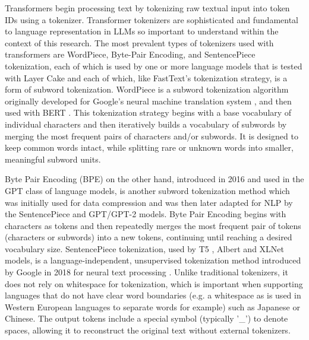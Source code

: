 \documentclass[final]{clv2025}
\begin{document}
Transformers begin processing text by tokenizing raw textual input into token IDs using a tokenizer. Transformer tokenizers are sophisticated and fundamental to language representation in LLMs so important to understand within the context of this research. The most prevalent types of tokenizers used with transformers are WordPiece, Byte-Pair Encoding, and SentencePiece tokenization, each of which is used by one or more language models that is tested with Layer Cake and each of which, like FastText's tokenization strategy, is a form of subword tokenization. WordPiece is a subword tokenization algorithm originally developed for Google's neural machine translation system \cite{schuster} \cite{wu}, and then used with BERT \cite{devlin-etal-2019-bert}. This tokenization strategy begins with a base vocabulary of individual characters and then iteratively builds a vocabulary of subwords by merging the most frequent pairs of characters and/or subwords. It is designed to keep common words intact, while splitting rare or unknown words into smaller, meaningful subword units. 

Byte Pair Encoding (BPE) on the other hand, introduced in 2016 \cite{sennrich-etal-2016-neural} and used in the GPT class of language models, is another subword tokenization method which was initially used for data compression and was then later adapted for NLP by the SentencePiece and GPT/GPT-2 models. Byte Pair Encoding begins with characters as tokens and then repeatedly merges the most frequent pair of tokens (characters or subwords) into a new tokens, continuing until reaching a desired vocabulary size. SentencePiece tokenization, used by T5 \cite{raffel2019exploring}, Albert \cite{lan2019albert} and XLNet \cite{yang2019xlnet} models, is a language-independent, unsupervised tokenization method introduced by Google in 2018 for neural text processing \cite{kudo2018sentencepiece}. Unlike traditional tokenizers, it does not rely on whitespace for tokenization, which is important when supporting languages that do not have clear word boundaries (e.g. a whitespace as is used in Western European languages to separate words for example) such as Japanese or Chinese. The output tokens include a special symbol (typically '\_') to denote spaces, allowing it to reconstruct the original text without external tokenizers.
\end{document}
